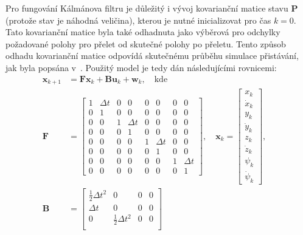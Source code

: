         Pro fungování Kálmánova filtru je důležitý i vývoj kovarianční matice stavu $\mathbf{P}$ (protože stav je náhodná veličina), kterou je nutné inicializovat pro čas $k=0$. Tato kovarianční matice byla také odhadnuta jako výběrová pro odchylky požadované polohy pro přelet od skutečné polohy po přeletu. Tento způsob odhadu kovarianční matice odpovídá skutečnému průběhu simulace přistávání, jak byla popsána v~. Použitý model je tedy dán následujícími rovnicemi:
        \begin{align}
            \mathbf{x}_{k+1} &= \mathbf{Fx}_k + \mathbf{Bu}_k + \mathbf{w}_k,\quad\mathrm{kde} \label{eq:kalmanx} \\
            \mathbf{F} &= \begin{bmatrix}
                1 & \Delta t & 0 &        0 & 0 & 0        & 0 & 0 \\
                0 & 1        & 0 &        0 & 0 & 0        & 0 & 0 \\
                0 & 0        & 1 & \Delta t & 0 & 0        & 0 & 0 \\
                0 & 0        & 0 & 1        & 0 & 0        & 0 & 0 \\
                0 & 0        & 0 & 0        & 1 & \Delta t & 0 & 0 \\
                0 & 0        & 0 & 0        & 0 & 1        & 0 & 0 \\
                0 & 0        & 0 & 0        & 0 & 0        & 1 & \Delta t\\
                0 & 0        & 0 & 0        & 0 & 0        & 0 & 1
            \end{bmatrix}, \quad \mathbf{x}_k = \begin{bmatrix}
                x_k \\ \dot x_k \\ y_k \\ \dot y_k \\ z_k \\ \dot z_k \\ \psi_k \\ \dot\psi_k
            \end{bmatrix}, \quad \nonumber\\
            \mathbf{B} &= \begin{bmatrix}
                \frac{1}{2}\Delta t^2 & 0 & 0 & 0 \\
                \Delta t & 0 & 0 & 0 \\
                0 & \frac{1}{2}\Delta t^2 & 0 & 0 \\

\end{bmatrix}
\end{align}

